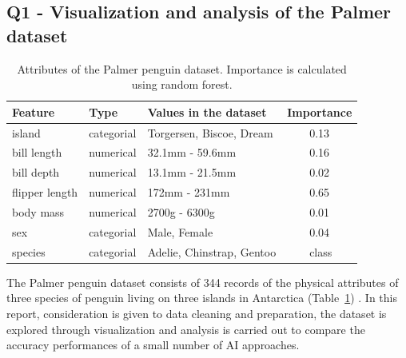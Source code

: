 \documentclass[12pt]{article}
\begin{document}
\begin{center}
\subsection*{Q1 - Visualization and analysis of the Palmer dataset}
\end{center}

\begin{table} %
  \small
  \begin{center}
  \vspace{-1.5\baselineskip} %
  \setlength{\abovecaptionskip}{5pt}
  \setlength{\belowcaptionskip}{5pt}
  \fontsize{10}{10}\selectfont %
  \begin{tabular}{l|l|l|l}
  \textbf{Feature}&\textbf{Type}&\textbf{Values in the dataset}&\textbf{Importance}\\
  \hline
  island&categorial&Torgersen, Biscoe, Dream&\ \ \ \ 0.13\\
  bill length&numerical&32.1mm - 59.6mm&\ \ \ \ 0.16\\
  bill depth&numerical&13.1mm - 21.5mm&\ \ \ \ 0.02\\
  flipper length&numerical&172mm - 231mm&\ \ \ \ 0.65\\
  body mass&numerical&2700g - 6300g&\ \ \ \ 0.01\\
  sex&categorial&Male, Female&\ \ \ \ 0.04\\
  species&categorial&Adelie, Chinstrap, Gentoo&\ \ \ \ class\\
  \end{tabular}
  \vspace{-2\baselineskip} %
  \end{center} 
  \caption{Attributes of the Palmer penguin dataset. Importance is calculated using random forest.}
  \vspace{-1\baselineskip} %
  \label{tab:dataset}
\end{table} 

\noindent
The Palmer penguin dataset consists of 344 records of the physical attributes of three species of penguin 
living on three islands in Antarctica (Table~\ref{tab:dataset}) \cite{PM}. 
In this report, consideration is given to data cleaning and preparation, 
the dataset is explored through visualization and analysis is carried out 
to compare the accuracy performances of a small number of AI approaches. 
\end{document}
